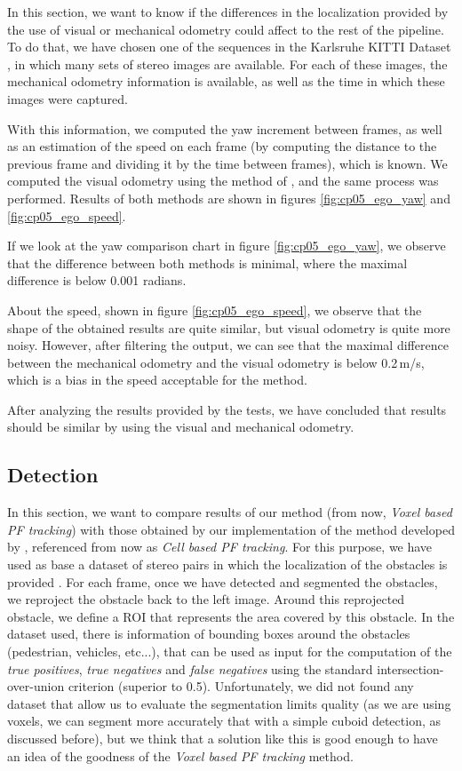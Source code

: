 In this section, we want to know if the differences in the localization provided by the use of visual or mechanical odometry could affect to the rest of the pipeline. To do that, we have chosen one of the sequences in the Karlsruhe KITTI Dataset \citep{geiger2013vision}, in which many sets of stereo images are available. For each of these images, the mechanical odometry information is available, as well as the time in which these images were captured.

With this information, we computed the yaw increment between frames, as well as an estimation of the speed on each frame (by computing the distance to the previous frame and dividing it by the time between frames), which is known. We computed the visual odometry using the method of \cite{geiger2011stereoscan}, and the same process was performed. Results of both methods are shown in figures \ref{fig:cp05_ego_yaw} and \ref{fig:cp05_ego_speed}.

If we look at the yaw comparison chart in figure \ref{fig:cp05_ego_yaw}, we observe that the difference between both methods is minimal, where the maximal difference is below 0.001 radians.

About the speed, shown in figure \ref{fig:cp05_ego_speed}, we observe that the shape of the obtained results are quite similar, but visual odometry is quite more noisy. However, after filtering the output, we can see that the maximal difference between the mechanical odometry and the visual odometry is below 0.2\,m/s, which is a bias in the speed acceptable for the method.

After analyzing the results provided by the tests, we have concluded that results should be similar by using the visual and mechanical odometry.

\subsection{Detection}\label{ch:chapter05_02_03}

In this section, we want to compare results of our method (from now, \emph{Voxel based PF tracking}) with those obtained by our implementation of the method developed by \cite{danescu2012particle}, referenced from now as \emph{Cell based PF tracking}. For this purpose, we have used as base a dataset of stereo pairs in which the localization of the obstacles is provided \citep{geiger2013vision}. For each frame, once we have detected and segmented the obstacles, we reproject the obstacle back to the left image. Around this reprojected obstacle, we define a \ac{ROI} that represents the area covered by this obstacle. In the dataset used, there is information of bounding boxes around the obstacles (pedestrian, vehicles, etc...), that can be used as input for the computation of the \emph{true positives}, \emph{true negatives} and \emph{false negatives} using the standard intersection-over-union criterion (superior to 0.5). Unfortunately, we did not found any dataset that allow us to evaluate the segmentation limits quality (as we are using voxels, we can segment more accurately that with a simple cuboid detection, as discussed before), but we think that a solution like this is good enough to have an idea of the goodness of the \emph{Voxel based PF tracking} method.

